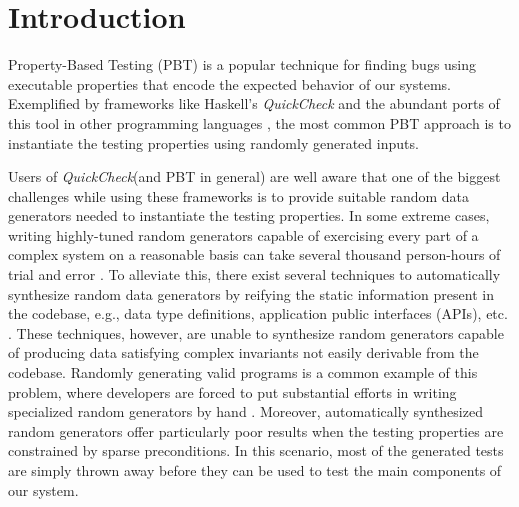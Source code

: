 \documentclass[acmsmall, anonymous]{acmart}
\newcommand{\quickcheck}{\textit{QuickCheck}\xspace}
\begin{document}


\maketitle



\section{Introduction}
\label{sec:intro}

%
Property-Based Testing (PBT) is a popular technique for finding bugs using
executable properties that encode the expected behavior of our systems.
%
Exemplified by frameworks like Haskell's \quickcheck \cite{ClaessenH00} and the
abundant ports of this tool in other programming languages
\cite{hughes2003erlang, papadakis2011proper, bulwahn2012new,
  denes2014quickchick}, the most common PBT approach is to instantiate the
testing properties using randomly generated inputs.


Users of \quickcheck (and PBT in general) are well aware that one of the biggest
challenges while using these frameworks is to provide suitable random data
generators needed to instantiate the testing properties.
%
In some extreme cases, writing highly-tuned random generators capable of
exercising every part of a complex system on a reasonable basis can take several
thousand person-hours of trial and error \cite{lampropoulos2019coverage}.
%
To alleviate this, there exist several techniques to automatically synthesize
random data generators by reifying the static information present in the
codebase, e.g., data type definitions, application public interfaces (APIs),
etc. \cite{GriecoCB16, DBLP:conf/haskell/MistaRH18, Mista2019GeneratingRS,
  DuregardJW12, Lampropoulos2017, Bendkowski2017}.
%
These techniques, however, are unable to synthesize random generators capable of
producing data satisfying complex invariants not easily derivable from the
codebase.
%
Randomly generating valid programs is a common example of this problem, where
developers are forced to put substantial efforts in writing specialized random
generators by hand \cite{Palka11, perenyi2020stack, yang2011finding}.
%
Moreover, automatically synthesized random generators offer particularly poor
results when the testing properties are constrained by sparse preconditions.
%
In this scenario, most of the generated tests are simply thrown away before they
can be used to test the main components of our system.
\end{document}
